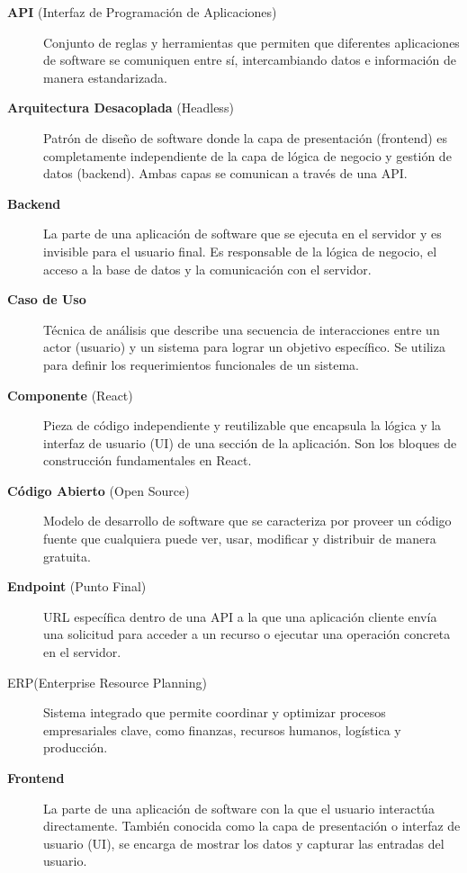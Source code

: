 \documentclass[12pt,letterpaper,spanish]{report}
\begin{document}
\begin{description}

  \item[\textbf{API} (Interfaz de Programación de Aplicaciones)] Conjunto de reglas y herramientas que permiten que diferentes aplicaciones de software se comuniquen entre sí, intercambiando datos e información de manera estandarizada.

  \item[\textbf{Arquitectura Desacoplada} (Headless)] Patrón de diseño de software donde la capa de presentación (frontend) es completamente independiente de la capa de lógica de negocio y gestión de datos (backend). Ambas capas se comunican a través de una API.

  \item[\textbf{Backend}] La parte de una aplicación de software que se ejecuta en el servidor y es invisible para el usuario final. Es responsable de la lógica de negocio, el acceso a la base de datos y la comunicación con el servidor.

  \item[\textbf{Caso de Uso}] Técnica de análisis que describe una secuencia de interacciones entre un actor (usuario) y un sistema para lograr un objetivo específico. Se utiliza para definir los requerimientos funcionales de un sistema.

  \item[\textbf{Componente} (React)] Pieza de código independiente y reutilizable que encapsula la lógica y la interfaz de usuario (UI) de una sección de la aplicación. Son los bloques de construcción fundamentales en React.

  \item[\textbf{Código Abierto} (Open Source)] Modelo de desarrollo de software que se caracteriza por proveer un código fuente que cualquiera puede ver, usar, modificar y distribuir de manera gratuita.
      
  \item[\textbf{Endpoint} (Punto Final)] URL específica dentro de una API a la que una aplicación cliente envía una solicitud para acceder a un recurso o ejecutar una operación concreta en el servidor.
    
      
  \item[ERP(Enterprise Resource Planning)]  Sistema integrado que permite coordinar y 
        optimizar procesos empresariales clave, como finanzas, recursos humanos, logística y producción. 
    
  \item[\textbf{Frontend}] La parte de una aplicación de software con la que el usuario interactúa directamente. También conocida como la capa de presentación o interfaz de usuario (UI), se encarga de mostrar los datos y capturar las entradas del usuario.
  

\end{description}
\end{document}

